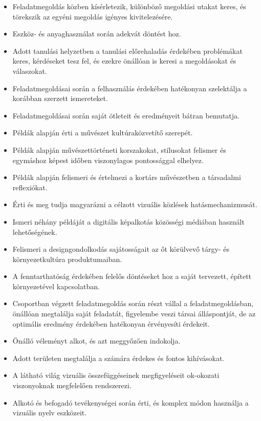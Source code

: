 \begin{itemize}
\item
  Feladatmegoldás közben kísérletezik, különböző megoldási utakat keres,
  és törekszik az egyéni megoldás igényes kivitelezésére.
\item
  Eszköz- és anyaghasználat során adekvát döntést hoz.
\item
  Adott tanulási helyzetben a tanulási előrehaladás érdekében
  problémákat keres, kérdéseket tesz fel, és ezekre önállóan is keresi a
  megoldásokat és válaszokat.
\item
  Feladatmegoldásai során a felhasználás érdekében hatékonyan
  szelektálja a korábban szerzett ismereteket.
\item
  Feladatmegoldásai során saját ötleteit és eredményeit bátran
  bemutatja.
\item
  Példák alapján érti a művészet kultúraközvetítő szerepét.
\item
  Példák alapján művészettörténeti korszakokat, stílusokat felismer és
  egymáshoz képest időben viszonylagos pontossággal elhelyez.
\item
  Példák alapján felismeri és értelmezi a kortárs művészetben a
  társadalmi reflexiókat.
\item
  Érti és meg tudja magyarázni a célzott vizuális közlések
  hatásmechanizmusát.
\item
  Ismeri néhány példáját a digitális képalkotás közösségi médiában
  használt lehetőségének.
\item
  Felismeri a designgondolkodás sajátosságait az őt körülvevő tárgy- és
  környezetkultúra produktumaiban.
\item
  A fenntarthatóság érdekében felelős döntéseket hoz a saját tervezett,
  épített környezetével kapcsolatban.
\item
  Csoportban végzett feladatmegoldás során részt vállal a
  feladatmegoldásban, önállóan megtalálja saját feladatát, figyelembe
  veszi társai álláspontját, de az optimális eredmény érdekében
  hatékonyan érvényesíti érdekeit.
\item
  Önálló véleményt alkot, és azt meggyőzően indokolja.
\item
  Adott területen megtalálja a számára érdekes és fontos kihívásokat.
\item
  A látható világ vizuális összefüggéseinek megfigyeléseit ok-okozati
  viszonyoknak megfelelően rendszerezi.
\item
  Alkotó és befogadó tevékenységei során érti, és komplex módon
  használja a vizuális nyelv eszközeit.

\end{itemize}
